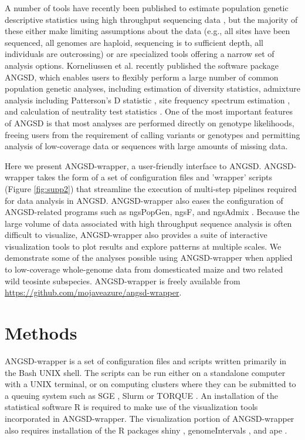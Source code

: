 \documentclass[10pt,a4paper]{article}
\begin{document}
A number of tools have recently been published to estimate population genetic descriptive statistics using high throughput sequencing data \citep{garrigan2013popbam, purcell2007plink, danecek2011variant, hutter2006genome}, but the majority of these either make limiting assumptions about the data (e.g., all sites have been sequenced, all genomes are haploid, sequencing is to sufficient depth, all individuals are outcrossing) or are specialized tools offering a narrow set of analysis options. 
Korneliussen et al. \citep{korneliussen2014angsd} recently published the software package ANGSD, which enables users to flexibly perform a large number of common population genetic analyses, including estimation of diversity statistics, admixture analysis including Patterson's D statistic \citep{Durand:2011jd}, site frequency spectrum estimation \citep{pmid22911679}, and calculation of neutrality test statistics \citep{korneliussen_calculation_2013}. 
One of the most important features of ANGSD is that most analyses are performed directly on genotype likelihoods, freeing users from the requirement of calling variants or genotypes and permitting analysis of low-coverage data or sequences with large amounts of missing data. 

Here we present ANGSD-wrapper, a user-friendly interface to ANGSD. 
ANGSD-wrapper takes the form of a set of configuration files and 'wrapper' scripts (Figure \ref{fig:supp2}) that streamline the execution of multi-step pipelines required for data analysis in ANGSD. ANGSD-wrapper also eases the configuration of ANGSD-related programs such as ngsPopGen, ngsF\citep{vieira2013estimating}, and ngsAdmix \citep{pmid24026093}.
Because the large volume of data associated with high throughput sequence analysis is often difficult to visualize, ANGSD-wrapper also provides a suite of interactive visualization tools to plot results and explore patterns at multiple scales.  
We demonstrate some of the analyses possible using ANGSD-wrapper when applied to low-coverage whole-genome data from domesticated maize and two related wild teosinte subspecies. 
ANGSD-wrapper is freely available from \url{https://github.com/mojaveazure/angsd-wrapper}.

\section*{Methods}
ANGSD-wrapper is a set of configuration files and scripts written primarily in the Bash UNIX shell.  
The scripts can be run either on a standalone computer with a UNIX terminal, or on computing clusters where they can be submitted to a queuing system such as SGE \citep{Microsystems):2001:SGE:560889.792378}, Slurm \citep{Jette02slurm:simple} or TORQUE \citep{Staples:2006:TRM:1188455.1188464}.  
An installation of the statistical software R \citep{Rcitation} is required to make use of the visualization tools incorporated in ANGSD-wrapper.  
The visualization portion of ANGSD-wrapper also requires installation of the R packages shiny \citep{shiny}, genomeIntervals \citep{genomeIntervals}, and ape \citep{APE}.
\end{document}
